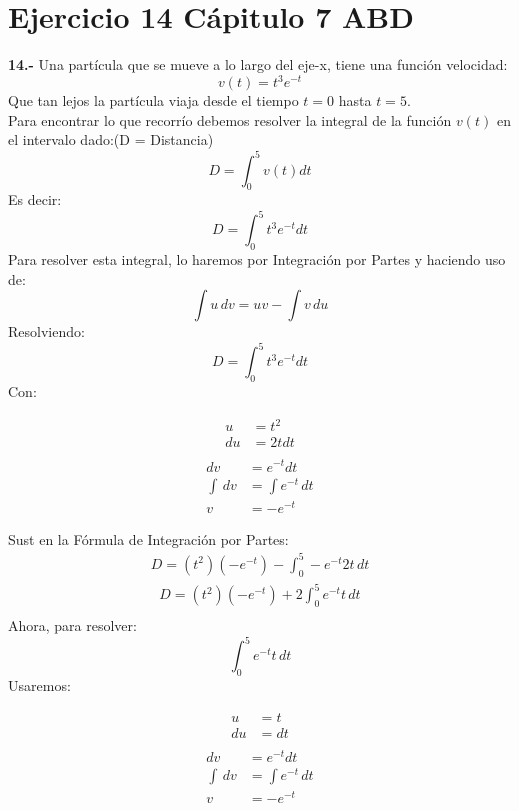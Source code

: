 \chapter*{Ejercicio 14 Cápitulo 7 ABD }

\textbf{14.-} Una partícula que se mueve a lo largo del eje-x, tiene una función velocidad:
\[
v(t) = t^{3}e^{-t}
\]
Que tan lejos la partícula viaja desde el tiempo $t=0$ hasta $t=5$. \\
Para encontrar lo que recorrío debemos resolver la integral de la función $v(t)$ en el intervalo dado:(D = Distancia)
\[
D = \int_{0}^{5} v(t) dt
\]
Es decir:
\[
D = \int_{0}^{5} t^{3}e^{-t}  dt
\]
Para resolver esta integral, lo haremos por Integración por Partes y haciendo uso de:
\[
\int u \, dv = uv - \int v \, du 
\]
Resolviendo:
\[
D = \int_{0}^{5} t^{3}e^{-t}  dt
\]
Con:
\begin{multicols}{2}
	\noindent
	\begin{align*}
		u &= t^{2}  \\
        du &= 2tdt \\
	\end{align*}
	\columnbreak
	\begin{align*}
	    dv &= e^{-t}  dt \\
        \int \, dv &= \int e^{-t}  \, dt \\
        v &= -e^{-t}
	\end{align*}
\end{multicols}
Sust en la Fórmula de Integración por Partes:
\begin{align}
    D = (t^{2})(-e^{-t}) - \int_{0}^{5} -e^{-t} 2t \,  dt 
\end{align}
\begin{align*}
    D = (t^{2})(-e^{-t}) + 2\int_{0}^{5} e^{-t} t \,  dt \\
\end{align*}
Ahora, para resolver:
\[
\int_{0}^{5} e^{-t} t \,  dt
\]
Usaremos:
\begin{multicols}{2}
	\noindent
	\begin{align*}
		u&= t  \\
        du &= dt \\
	\end{align*}
	\columnbreak
	\begin{align*}
	    dv &= e^{-t}  dt \\
        \int \, dv &= \int e^{-t}  \, dt \\
        v &= -e^{-t}
	\end{align*}
\end{multicols}
